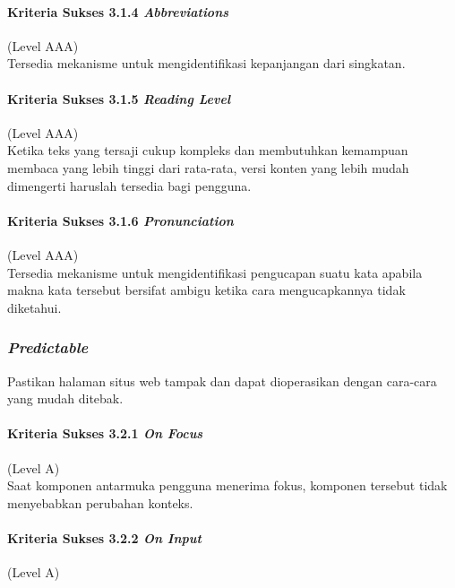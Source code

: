\paragraph{Kriteria Sukses 3.1.4 \textit{Abbreviations}}
\label{sec:kriteria_sukses_3.1.4}
(Level AAA)\\

Tersedia mekanisme untuk mengidentifikasi kepanjangan dari singkatan.

\paragraph{Kriteria Sukses 3.1.5 \textit{Reading Level}}
\label{sec:kriteria_sukses_3.1.5}
(Level AAA)\\

Ketika teks yang tersaji cukup kompleks dan membutuhkan kemampuan membaca yang lebih tinggi dari rata-rata, versi konten yang lebih mudah dimengerti haruslah tersedia bagi pengguna.

\paragraph{Kriteria Sukses 3.1.6 \textit{Pronunciation}}
\label{sec:kriteria_sukses_3.1.6}
(Level AAA)\\

Tersedia mekanisme untuk mengidentifikasi pengucapan suatu kata apabila makna kata tersebut bersifat ambigu ketika cara mengucapkannya tidak diketahui.

\subsubsection{\textit{Predictable}}
\label{sec:predictable}
Pastikan halaman situs web tampak dan dapat dioperasikan dengan cara-cara yang mudah ditebak.

\paragraph{Kriteria Sukses 3.2.1 \textit{On Focus}}
\label{sec:kriteria_sukses_3.2.1}
(Level A)\\

Saat komponen antarmuka pengguna menerima fokus, komponen tersebut tidak menyebabkan perubahan konteks.

\paragraph{Kriteria Sukses 3.2.2 \textit{On Input}}
\label{sec:kriteria_sukses_3.2.2}
(Level A)\\

